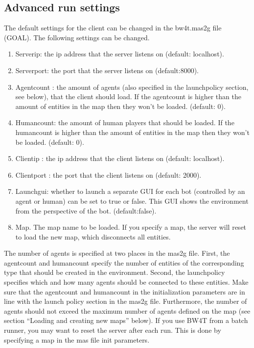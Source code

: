 \documentclass[11pt,a4paper]{article}
\begin{document}
\subsection{Advanced run settings}
The default settings for the client can be changed in the bw4t.mas2g file (GOAL). The following settings can be changed.
\begin{enumerate}
\item Serverip: the ip address that the server listens on (default: localhost).
\item Serverport: the port that the server listens on (default:8000).
\item Agentcount : the amount of agents (also specified in the launchpolicy section, see below), that the client should load. If the agentcount is higher than the amount of entities in the map then they won’t be loaded. (default: 0).
\item Humancount: the amount of human players that should be loaded. If the humancount is higher than the amount of entities in the map then they won’t be loaded. (default: 0).
\item Clientip : the ip address that the client listens on (default: localhost).
\item Clientport : the port that the client listens on (default: 2000).
\item Launchgui: whether to launch a separate GUI for each bot (controlled by an agent or human) can be set to true or false. This GUI shows the environment from the perspective of the bot. (default:false).
\item Map. The map name to be loaded. If you specify a map, the server will reset to load the new map, which disconnects all entities.
\end{enumerate}
The number of agents is specified at two places in the mas2g file. First, the agentcount and humancount specify the number of entities of the corresponding type that should be created in the environment. Second, the launchpolicy specifies which and how many agents should be connected to these entities. Make sure that the agentcount and humancount in the initialization parameters are in line with the launch policy section in the mas2g file. Furthermore, the number of agents should not exceed the maximum number of agents defined on the map (see section “Loading and creating new maps” below).
If you use BW4T from a batch runner, you may want to reset the server after each run. This is done by specifying a map in the mas file init parameters.
\end{document}
